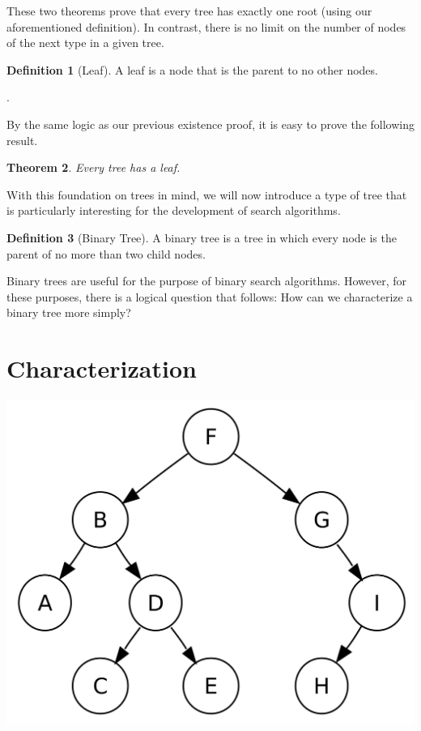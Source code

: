 \documentclass[12pt]{article}
\newtheorem{theorem}{Theorem}[section]
\theoremstyle{definition}
\newtheorem{definition}[theorem]{Definition}
\theoremstyle{remark}
\begin{document}
These two theorems prove that every tree has exactly one root (using our aforementioned definition). In contrast, there is no limit on the number of nodes of the next type in a given tree.

\begin{definition}[Leaf]
A leaf is a node that is the parent to no other nodes.
\end{definition}.

By the same logic as our previous existence proof, it is easy to prove the following result.

\begin{theorem}
Every tree has a leaf.
\end{theorem}

With this foundation on trees in mind, we will now introduce a type of tree that is particularly interesting for the development of search algorithms.

\begin{definition}[Binary Tree]
A binary tree is a tree in which every node is the parent of no more than two child nodes.
\end{definition}

Binary trees are useful for the purpose of binary search algorithms. However, for these purposes, there is a logical question that follows: How can we characterize a binary tree more simply?

\section{Characterization}
\includegraphics[scale=.125]{Binary}
\end{document}
